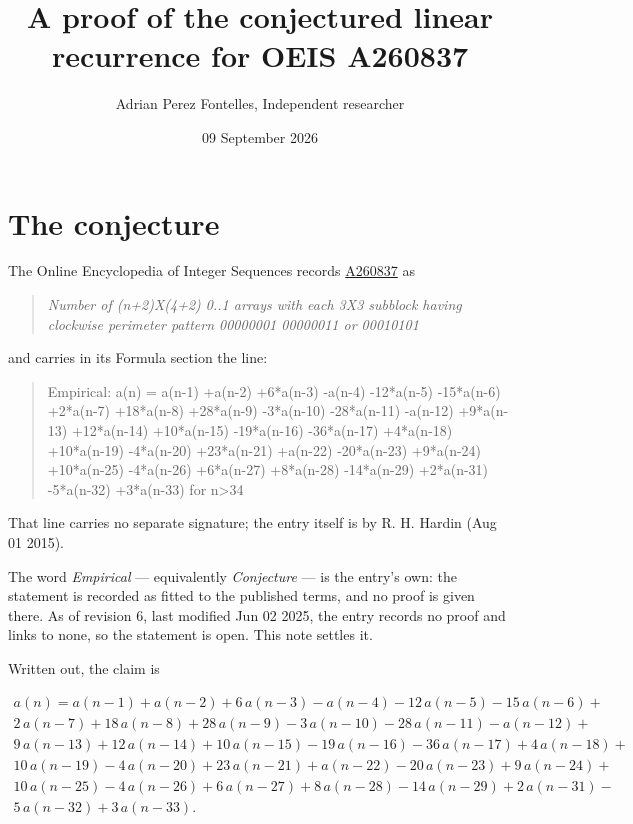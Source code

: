 \documentclass[11pt]{article}
\title{A proof of the conjectured linear recurrence for OEIS A260837}
\author{Adrian Perez Fontelles, Independent researcher}
\date{09 September 2026}
\theoremstyle{definition}
\begin{document}
\maketitle
\section{The conjecture}

The Online Encyclopedia of Integer Sequences records \href{https://oeis.org/A260837}{A260837} as

\begin{quote}\itshape Number of (n+2)X(4+2) 0..1 arrays with each 3X3 subblock having clockwise perimeter pattern 00000001 00000011 or 00010101\end{quote}

and carries in its Formula section the line:

\begin{quote}\ttfamily Empirical: a(n) = a(n-1) +a(n-2) +6*a(n-3) -a(n-4) -12*a(n-5) -15*a(n-6) +2*a(n-7) +18*a(n-8) +28*a(n-9) -3*a(n-10) -28*a(n-11) -a(n-12) +9*a(n-13) +12*a(n-14) +10*a(n-15) -19*a(n-16) -36*a(n-17) +4*a(n-18) +10*a(n-19) -4*a(n-20) +23*a(n-21) +a(n-22) -20*a(n-23) +9*a(n-24) +10*a(n-25) -4*a(n-26) +6*a(n-27) +8*a(n-28) -14*a(n-29) +2*a(n-31) -5*a(n-32) +3*a(n-33) for n>34\end{quote}

That line carries no separate signature; the entry itself is by R. H. Hardin (Aug 01 2015).

The word {\itshape Empirical} --- equivalently {\itshape Conjecture} --- is the entry's own: the statement is recorded as fitted to the published terms, and no proof is given there. As of revision 6, last modified Jun 02 2025, the entry records no proof and links to none, so the statement is open. This note settles it.

Written out, the claim is

\begin{multline*} a(n) = a(n-1) + a(n-2) + 6\,a(n-3) - a(n-4) - 12\,a(n-5) - 15\,a(n-6) + \\ 2\,a(n-7) + 18\,a(n-8) + 28\,a(n-9) - 3\,a(n-10) - 28\,a(n-11) - a(n-12) + \\ 9\,a(n-13) + 12\,a(n-14) + 10\,a(n-15) - 19\,a(n-16) - 36\,a(n-17) + 4\,a(n-18) + \\ 10\,a(n-19) - 4\,a(n-20) + 23\,a(n-21) + a(n-22) - 20\,a(n-23) + 9\,a(n-24) + \\ 10\,a(n-25) - 4\,a(n-26) + 6\,a(n-27) + 8\,a(n-28) - 14\,a(n-29) + 2\,a(n-31) - \\ 5\,a(n-32) + 3\,a(n-33). \end{multline*}
\end{document}
